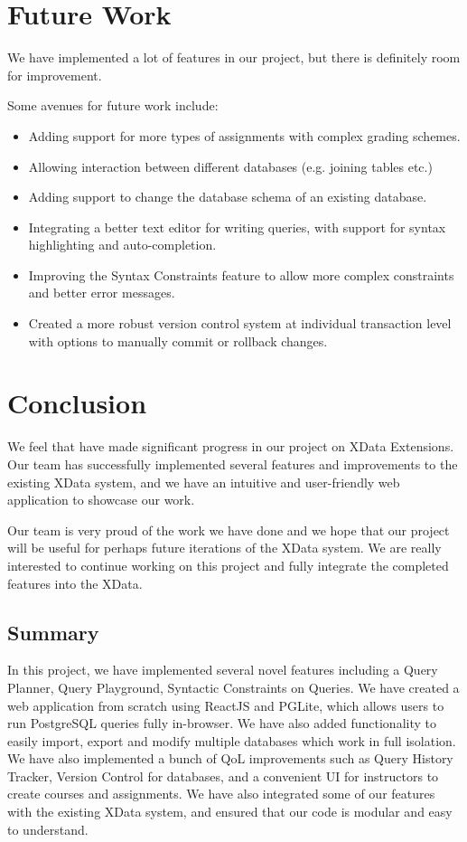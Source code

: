 \documentclass[11pt]{article}
\begin{document}
\section{Future Work}
\label{sec:future-work}

We have implemented a lot of features in our project, but there is definitely room for improvement. 

Some avenues for future work include:
\begin{itemize}
    \item Adding support for more types of assignments with complex grading schemes.
    \item Allowing interaction between different databases (e.g. joining tables etc.)
    \item Adding support to change the database schema of an existing database.
    \item Integrating a better text editor for writing queries, with support for syntax highlighting and auto-completion.
    \item Improving the Syntax Constraints feature to allow more complex constraints and better error messages.
    \item Created a more robust version control system at individual transaction level with options to manually commit or rollback changes.
\end{itemize}


\section{Conclusion}

We feel that have made significant progress in our project on XData Extensions. Our team has successfully implemented several features and improvements to the existing XData system, and we have an intuitive and user-friendly web application to showcase our work. 

\medskip

Our team is very proud of the work we have done and we hope that our project will be useful for perhaps future iterations of the XData system. We are really interested to continue working on this project and fully integrate the completed features into the XData.

\subsection{Summary}
In this project, we have implemented several novel features including a Query Planner, Query Playground, Syntactic Constraints on Queries. We have created a web application from scratch using ReactJS and PGLite, which allows users to run PostgreSQL queries fully in-browser. We have also added functionality to easily import, export and modify multiple databases which work in full isolation. We have also implemented a bunch of QoL improvements such as Query History Tracker, Version Control for databases, and a convenient UI for instructors to create courses and assignments. We have also integrated some of our features with the existing XData system, and ensured that our code is modular and easy to understand. 
\end{document}
